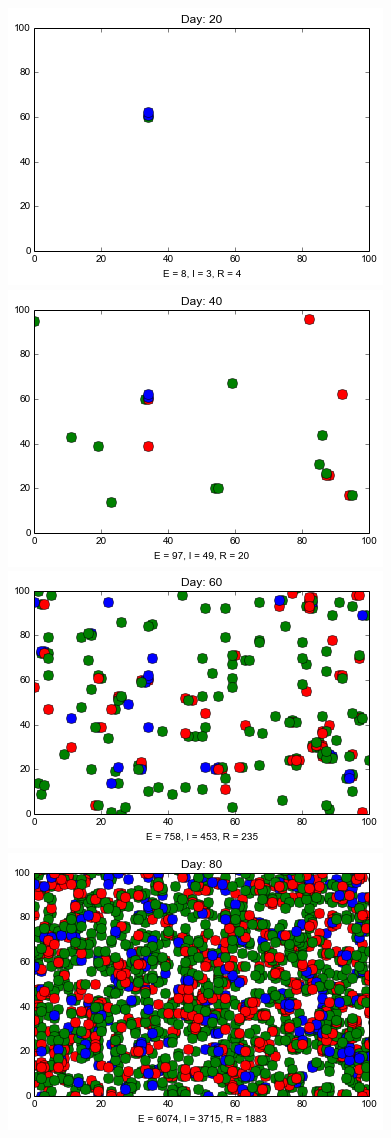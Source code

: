 \begin{figure}
\medskip
\includegraphics[scale=0.25]{images/4t20.png} \quad
\includegraphics[scale=0.25]{images/4t40.png} \quad
\includegraphics[scale=0.25]{images/4t60.png} \quad
\includegraphics[scale=0.25]{images/4t80.png} 


\end{figure}
